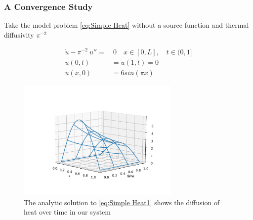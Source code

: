 \documentclass{uonmathreport}
\theoremstyle{definition}
\theoremstyle{problem}
\theoremstyle{theorem}
\begin{document}
\subsubsection{A Convergence Study} \label{subsec:convegence2}

Take the model problem \ref{eq:Simple Heat} without a source function and thermal diffusivity $\pi^{-2}$

\begin{subequations} 
\begin{align}\label{eq:Simple Heat1}
  \dot{u} - \pi^{-2} \: u'' = &\: 0 \quad x \in [0, L], \quad t \in (0, 1]  \\ 
  u(0, t) & = u(1, t) = 0\\
  u(x, 0) & =  6sin( \pi x)
\end{align}
\end{subequations}

\begin{figure}
\caption{The analytic solution to \ref{eq:Simple Heat1} shows the diffusion of heat over time in our system}
 \label{fig:Heat1}
   \includegraphics[width=0.7\textwidth]{Heat1angle.pdf}
\end{figure}
\end{document}
